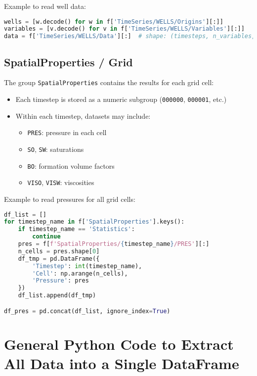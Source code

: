 \documentclass[12pt,a4paper]{article}
\begin{document}
Example to read well data:

\begin{lstlisting}[language=Python]
wells = [w.decode() for w in f['TimeSeries/WELLS/Origins'][:]]
variables = [v.decode() for v in f['TimeSeries/WELLS/Variables'][:]]
data = f['TimeSeries/WELLS/Data'][:]  # shape: (timesteps, n_variables, n_wells)
\end{lstlisting}

\subsection{SpatialProperties / Grid}

The group \texttt{SpatialProperties} contains the results for each grid cell:

\begin{itemize}
    \item Each timestep is stored as a numeric subgroup (\texttt{000000}, \texttt{000001}, etc.)
    \item Within each timestep, datasets may include:
    \begin{itemize}
        \item \texttt{PRES}: pressure in each cell
        \item \texttt{SO}, \texttt{SW}: saturations
        \item \texttt{BO}: formation volume factors
        \item \texttt{VISO}, \texttt{VISW}: viscosities
    \end{itemize}
\end{itemize}

Example to read pressures for all grid cells:

\begin{lstlisting}[language=Python]
df_list = []
for timestep_name in f['SpatialProperties'].keys():
    if timestep_name == 'Statistics':
        continue
    pres = f[f'SpatialProperties/{timestep_name}/PRES'][:]
    n_cells = pres.shape[0]
    df_tmp = pd.DataFrame({
        'Timestep': int(timestep_name),
        'Cell': np.arange(n_cells),
        'Pressure': pres
    })
    df_list.append(df_tmp)

df_pres = pd.concat(df_list, ignore_index=True)
\end{lstlisting}

\section{General Python Code to Extract All Data into a Single DataFrame}
\end{document}
